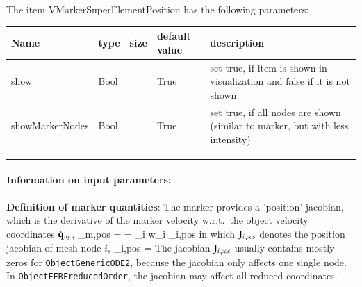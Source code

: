 The item VMarkerSuperElementPosition has the following parameters:\vspace{-1cm}\\ 
\begin{center}
  \footnotesize
  \begin{longtable}{| p{4.5cm} | p{2.5cm} | p{0.5cm} | p{2.5cm} | p{6cm} |}
    \hline
    \bf Name & \bf type & \bf size & \bf default value & \bf description \\ \hline
    show &     Bool &      &     True &     set true, if item is shown in visualization and false if it is not shown\\ \hline
    showMarkerNodes &     Bool &      &     True &     set true, if all nodes are shown (similar to marker, but with less intensity)\\ \hline
	  \end{longtable}
	\end{center}
\par\noindent\rule{\textwidth}{0.4pt}
\label{description_MarkerSuperElementPosition}
\paragraph{Information on input parameters:} 
\finishTable
 \noindent
    {\bf Definition of marker quantities}:
    \finishTable
%
    \vspace{6pt}
    The marker provides a 'position' jacobian, which is the derivative of the marker velocity w.r.t.\ the 
    object velocity coordinates $\dot {\mathbf{q}}_{n_b}$,
    \be
      \Jm_{m,pos} = 
      = \sum_i w_i \cdot \Jm_{i,pos}
    \ee
    in which $\mathbf{J}_{i,pos}$ denotes the position jacobian of mesh node $i$,
    \be
      \Jm_{i,pos} = 
    \ee
    The jacobian $\mathbf{J}_{i,pos}$ usually contains mostly zeros for \texttt{ObjectGenericODE2}, because the jacobian only affects one single node.
    In \texttt{ObjectFFRFreducedOrder}, the jacobian may affect all reduced coordinates.

